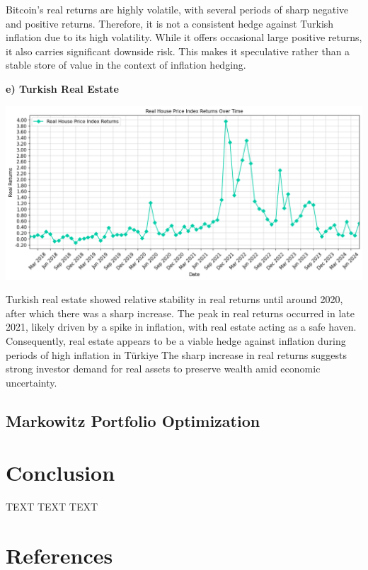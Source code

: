 \documentclass[
]{article}
\begin{document}
Bitcoin's real returns are highly volatile, with several periods of sharp negative and positive returns. Therefore, it is not a consistent hedge against Turkish inflation due to its high volatility. While it offers occasional large positive returns, it also carries significant downside risk. This makes it speculative rather than a stable store of value in the context of inflation hedging.

\textbf{e) Turkish Real Estate}

\includegraphics[width=\textwidth]{real-returns-hpi.png}

Turkish real estate showed relative stability in real returns until around 2020, after which there was a sharp increase. The peak in real returns occurred in late 2021, likely driven by a spike in inflation, with real estate acting as a safe haven. Consequently, real estate appears to be a viable hedge against inflation during periods of high inflation in Türkiye The sharp increase in real returns suggests strong investor demand for real assets to preserve wealth amid economic uncertainty.

\subsection{Markowitz Portfolio Optimization}

\section{Conclusion}\label{conclusion}

TEXT TEXT TEXT

\pagebreak

\section{References}


\end{document}
